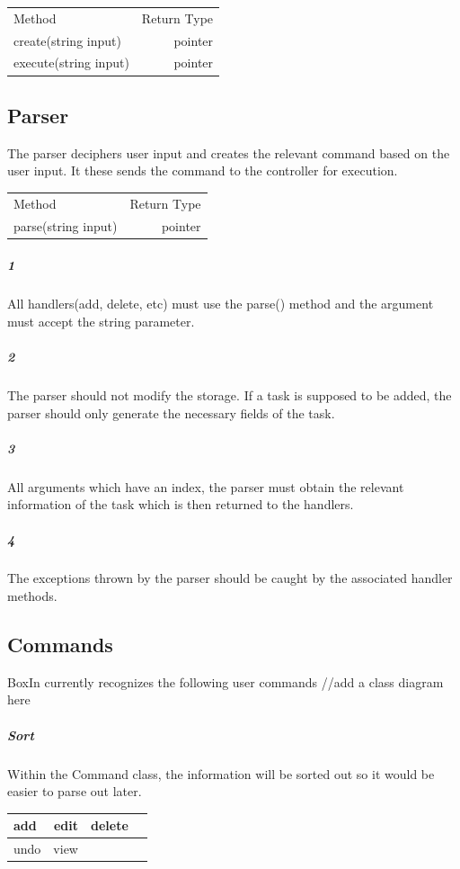 \documentclass[12pt]{extarticle}
\begin{document}
\begin{center}
\begin{tabular}{|l|r|}
Method                & Return Type \\
create(string input)  & pointer     \\
execute(string input) & pointer    
\end{tabular}
\end{center}

\subsection{Parser}

The parser deciphers user input and creates the relevant command based on the user input. It these sends the command to the controller for execution.

\begin{center}
\begin{tabular}{|l|r|}
Method              & Return Type \\
parse(string input) & pointer    
\end{tabular}
\end{center}

\subparagraph{1} All handlers(add, delete, etc) must use the parse() method and the argument must accept the string parameter.

\subparagraph{2} The parser should not modify the storage. If a task is supposed to be added, the parser should only generate the necessary fields of the task.

\subparagraph{3} All arguments which have an index, the parser must obtain the relevant information of the task which is then returned to the handlers.

\subparagraph{4} The exceptions thrown by the parser should be caught by the associated handler methods.

\subsection{Commands}
BoxIn currently recognizes the following user commands
//add a class diagram here 
\subparagraph{Sort}
Within the Command class, the information will be sorted out so it would be easier to parse out later.

\begin{center}
\begin{tabular}{  lrrl}
\hline
add & edit & delete\\
\hline
undo & view\\
\hline     
\end{tabular}
\end{center}
\end{document}
